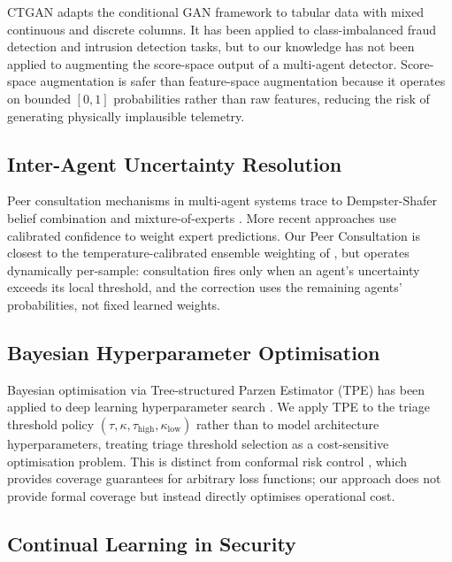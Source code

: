 \documentclass[journal]{IEEEtran}
\newcommand{\tauh}{\tau_{\mathrm{high}}}
\newcommand{\klow}{\kappa_{\mathrm{low}}}
\begin{document}
CTGAN \cite{xu_ctgan_2019} adapts the conditional GAN framework to
tabular data with mixed continuous and discrete columns.
It has been applied to class-imbalanced fraud detection
\cite{fiore_using_gans_2019} and intrusion detection
\cite{lin_idsgan_2022} tasks, but to our knowledge has not been applied
to augmenting the score-space output of a multi-agent detector.
Score-space augmentation is safer than feature-space augmentation
because it operates on bounded $[0,1]$ probabilities rather than raw
features, reducing the risk of generating physically implausible telemetry.

\subsection{Inter-Agent Uncertainty Resolution}

Peer consultation mechanisms in multi-agent systems trace to
Dempster-Shafer belief combination \cite{shafer_mathematical_1976} and
mixture-of-experts \cite{jacobs_mixture_1991}.
More recent approaches use calibrated confidence
\cite{guo2017calibration} to weight expert predictions.
Our Peer Consultation is closest to the temperature-calibrated ensemble
weighting of \cite{lakshminarayanan_simple_2017}, but operates
dynamically per-sample: consultation fires only when an agent's
uncertainty exceeds its local threshold, and the correction uses the
remaining agents' probabilities, not fixed learned weights.

\subsection{Bayesian Hyperparameter Optimisation}

Bayesian optimisation via Tree-structured Parzen Estimator (TPE)
\cite{bergstra_algorithms_2011} has been applied to deep learning
hyperparameter search \cite{optuna_akiba_2019}.
We apply TPE to the triage threshold policy
$(\tau, \kappa, \tauh, \klow)$ rather than to model architecture
hyperparameters, treating triage threshold selection as a
cost-sensitive optimisation problem.
This is distinct from conformal risk control
\cite{angelopoulos_conformal_risk_2022}, which provides coverage
guarantees for arbitrary loss functions; our approach does not provide
formal coverage but instead directly optimises operational cost.

\subsection{Continual Learning in Security}
\end{document}
